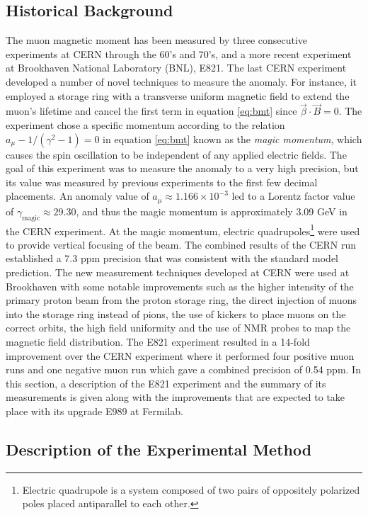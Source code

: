 \documentclass{outhesis}
\begin{document}
\subsection{Historical Background}
The muon magnetic moment has been measured by three consecutive experiments at CERN through the 60's and 70's, and a more recent experiment at Brookhaven National Laboratory (BNL), E821. The last CERN experiment developed a number of novel techniques to measure the anomaly. For instance, it employed a storage ring with a transverse uniform magnetic field to extend the muon's lifetime and cancel the first term in equation \ref{eq:bmt} since $\overrightarrow{\beta} \cdot \overrightarrow{B} = 0$. The experiment chose a specific momentum according to the relation $a_{\mu} -1/\left(\gamma^2-1\right) = 0$ in equation  \ref{eq:bmt} known as the \emph{magic momentum}, which causes the spin oscillation to be independent of any applied electric fields. The goal of this experiment was to measure the anomaly to a very high precision, but its value was measured by previous experiments to the first few decimal placements. An anomaly value of $a_{\mu} \approx 1.166\times 10^{-3}$ led to a Lorentz factor value of $\gamma_{\text{magic}} \approx 29.30$, and thus the magic momentum is approximately 3.09 GeV in the CERN experiment. 
At the magic momentum, electric quadrupoles\footnote{Electric quadrupole is a system composed of two pairs of oppositely polarized poles placed antiparallel to each other.} were used to provide vertical focusing of the beam. The combined results of the CERN run established a 7.3 ppm precision that was consistent with the standard model prediction. The new measurement techniques developed at CERN were used at Brookhaven with some notable improvements such as the higher intensity of the primary proton beam from the proton storage ring, the direct injection of muons into the storage ring instead of pions, the use of kickers to place muons on the correct orbits, the  high field uniformity and the use of NMR probes to map the magnetic field distribution. The E821 experiment resulted in a 14-fold improvement over the CERN experiment where it performed four positive muon runs and one negative muon run which gave a combined precision of 0.54 ppm. In this section, a description of the E821 experiment and the summary of its measurements is given along with the improvements that are expected to take place with its upgrade E989 at Fermilab.\\


\subsection{Description of the Experimental Method}
\end{document}
